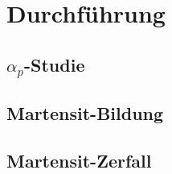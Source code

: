 \chapter{Durchführung}

\section{$\alpha_p$-Studie}

\section{Martensit-Bildung}

\section{Martensit-Zerfall}